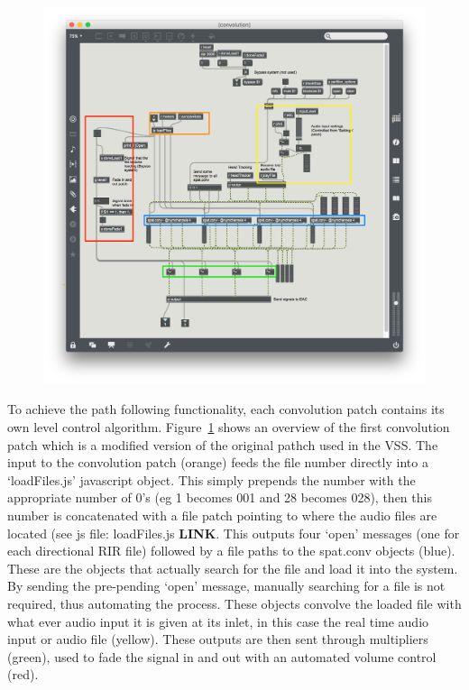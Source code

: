\documentclass[../../main.tex]{subfiles}
\begin{document}
			\begin{figure}[H]
				\centerline{\includegraphics[scale = 0.5]{Sections/Implementation/Max/images/Max/Iteration3/convPatch_edit.png}}
				\caption{}
				\label{convPatch}
			\end{figure}

			To achieve the path following functionality, each convolution patch contains its own level control algorithm. Figure~\ref{convPatch} shows an overview of the first convolution patch which is a modified version of the original pathch used in the \ac{VSS}. The input to the convolution patch (orange) feeds the file number directly into a `loadFiles.js' javascript object. This simply prepends the number with the appropriate number of 0's (eg 1 becomes 001 and 28 becomes 028), then this number is concatenated with a file patch pointing to where the audio files are located (see js file: loadFiles.js \textbf{LINK}. This outputs four `open' messages (one for each directional \ac{RIR} file)  followed by a file paths to the spat.conv objects (blue). These are the objects that actually search for the file and load it into the system. By sending the pre-pending `open' message, manually searching for a file is not required, thus automating the process. These objects convolve the loaded file with what ever audio input it is given at its inlet, in this case the real time audio input or audio file (yellow). These outputs are then sent through multipliers (green), used to fade the signal in and out with an automated volume control (red).
		 	
\end{document}
